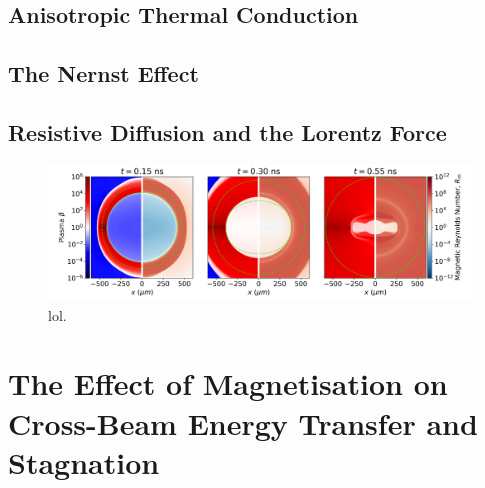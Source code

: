 \subsection{Anisotropic Thermal Conduction}%
\label{sec:Res2_aniso}



\subsection{The Nernst Effect}%
\label{sec:Res2_nernst}



\subsection{Resistive Diffusion and the Lorentz Force}%
\label{sec:Res2_resis}


\begin{figure}[t!]
    \includegraphics[width=\linewidth]{Results2/Images/magmag_beta_Rm.png}
    \centering
    \caption{lol.}%
    \label{fig:Res2_magmag_beta_Rm}
\end{figure}



\section{The Effect of Magnetisation on Cross-Beam Energy Transfer and Stagnation}%
\label{sec:Res2_mag_on_CBET}


